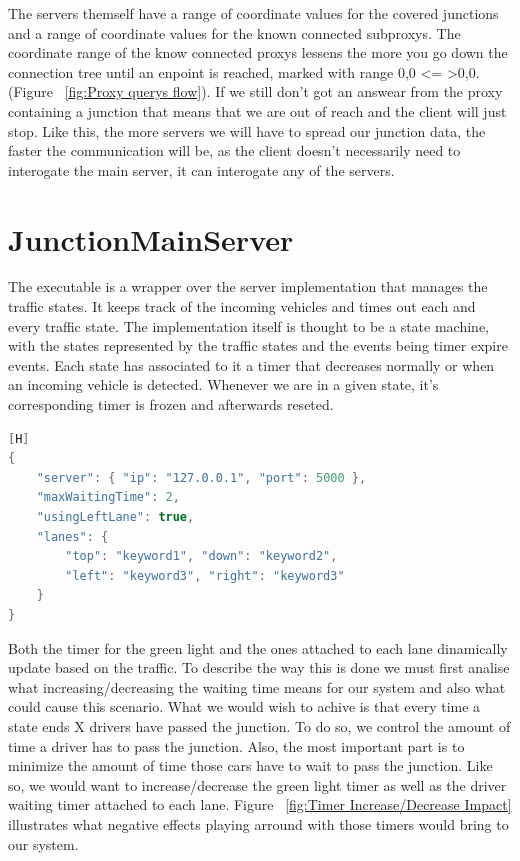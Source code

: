 \documentclass[17pt]{report}
\begin{document}
The servers themself have a range of coordinate values for the covered junctions
and a range of coordinate values for the known connected subproxys. The coordinate 
range of the know connected proxys lessens the more you go down the connection tree 
until an enpoint is reached, marked with range {0,0} \textless = \textgreater {0,0}.
(Figure ~\ref{fig:Proxy querys flow}). If we still don't got 
an answear from the proxy containing a junction that means that we are out of reach 
and the client will just stop. Like this, the more servers we will have to spread our 
junction data, the faster the communication will be, as the client doesn't necessarily
need to interogate the main server, it can interogate any of the servers.
\pagebreak


\section{JunctionMainServer}

\indent \indent
The executable is a wrapper over the server implementation that manages the traffic states.
It keeps track of the incoming vehicles and times out each and every traffic state. The 
implementation itself is thought to be a state machine, with the states represented by the 
traffic states and the events being timer expire events. Each state has associated to it 
a timer that decreases normally or when an incoming vehicle is detected. Whenever we 
are in a given state, it's corresponding timer is frozen and afterwards reseted.

\begin{lstlisting}[language = C++][H]
{ 
    "server": { "ip": "127.0.0.1", "port": 5000 },
    "maxWaitingTime": 2,
    "usingLeftLane": true,
    "lanes": { 
        "top": "keyword1", "down": "keyword2",
        "left": "keyword3", "right": "keyword3"
    } 
}
\end{lstlisting}

Both the timer for the green light and the ones attached to each lane 
dinamically update based on the traffic. To describe the way this is 
done we must first analise what increasing/decreasing the waiting time 
means for our system and also what could cause this scenario. 
What we would wish to achive is that every time a state ends X
drivers have passed the junction. To do so, we control the amount of 
time a driver has to pass the junction. Also, the most important part 
is to minimize the amount of time those cars have to wait to pass the 
junction. Like so, we would want to increase/decrease the green light 
timer as well as the driver waiting timer attached to each lane. 
Figure ~\ref{fig:Timer Increase/Decrease Impact} illustrates
what negative effects playing arround with those timers would bring
to our system.
\end{document}
